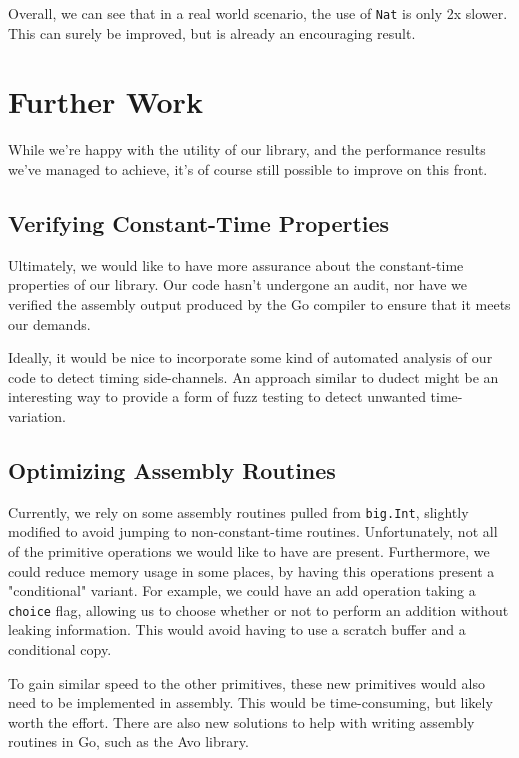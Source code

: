 \documentclass[11pt, a4paper]{article} %
\begin{document}
{Overall, we can see that in a real world scenario, the use
of \texttt{Nat} is only 2x slower. This can surely be improved,
but is already an encouraging result.

\section{Further Work}

While we're happy with the utility of our library,
and the performance results we've managed to achieve, it's
of course still possible to improve on this front.

\subsection{Verifying Constant-Time Properties}

Ultimately, we would like to have more assurance about the
constant-time properties of our library. Our code hasn't
undergone an audit, nor have we verified the assembly output
produced by the Go compiler to ensure that it meets our demands.

Ideally, it would be nice to incorporate some kind of automated
analysis of our code to detect timing side-channels. An approach
similar to dudect
\cite{reparaz_dude_2017} 
might be an interesting way to provide a form of fuzz testing
to detect unwanted time-variation.

\subsection{Optimizing Assembly Routines}

Currently, we rely on some assembly routines pulled from
\texttt{big.Int}, slightly modified to avoid jumping to non-constant-time
routines. Unfortunately, not all of the primitive operations we would
like to have are present. Furthermore, we could reduce memory usage
in some places, by having this operations present a "conditional"
variant. For example, we could have an add operation taking a
\texttt{choice} flag, allowing us to choose whether or not to perform
an addition without leaking information. This would avoid having
to use a scratch buffer and a conditional copy.

To gain similar speed to the other primitives, these new primitives
would also need to be implemented in assembly. This would be time-consuming,
but likely worth the effort. There are also new solutions
to help with writing assembly routines in Go, such as the Avo library.

}
\end{document}
